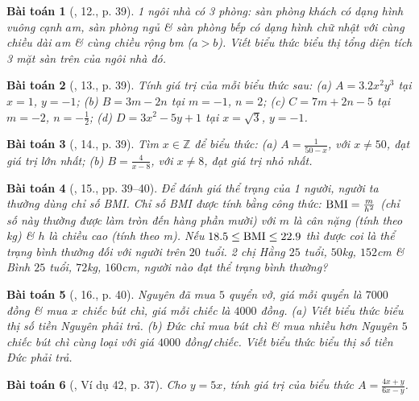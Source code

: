 \documentclass{article}
\newtheorem{baitoan}{Bài toán}
\begin{document}
\begin{baitoan}[\cite{SBT_Toan_7_Canh_Dieu_tap_2}, 12., p. 39]
	1 ngôi nhà có 3 phòng: sàn phòng khách có dạng hình vuông cạnh $a$\emph{m}, sàn phòng ngủ \& sàn phòng bếp có dạng hình chữ nhật với cùng chiều dài $a$\emph{m} \& cùng chiều rộng $b$\emph{m} ($a > b$). Viết biểu thức biểu thị tổng diện tích 3 mặt sàn trên của ngôi nhà đó.
\end{baitoan}

\begin{baitoan}[\cite{SBT_Toan_7_Canh_Dieu_tap_2}, 13., p. 39]
	Tính giá trị của mỗi biểu thức sau: (a) $A = 3.2x^2y^3$ tại $x = 1$, $y = -1$; (b) $B = 3m - 2n$ tại $m = -1$, $n = 2$; (c) $C = 7m + 2n - 5$ tại $m = -2$, $n = -\frac{1}{2}$; (d) $D = 3x^2 - 5y + 1$ tại $x = \sqrt{3}$, $y = -1$.
\end{baitoan}

\begin{baitoan}[\cite{SBT_Toan_7_Canh_Dieu_tap_2}, 14., p. 39]
	Tìm $x\in\mathbb{Z}$ để biểu thức: (a) $A = \frac{1}{50 - x}$, với $x\ne50$, đạt giá trị lớn nhất; (b) $B = \frac{4}{x - 8}$, với $x\ne8$, đạt giá trị nhỏ nhất.
\end{baitoan}

\begin{baitoan}[\cite{SBT_Toan_7_Canh_Dieu_tap_2}, 15., pp. 39--40]
	Để đánh giá thể trạng của 1 người, người ta thường dùng chỉ số BMI. Chỉ số BMI được tính bằng công thức: ${\rm BMI} = \frac{m}{h^2}$ (chỉ số này thường được làm tròn đến hàng phần mười) với $m$ là cân nặng (tính theo \emph{kg}) \& $h$ là chiều cao (tính theo \emph{m}). Nếu $18.5\le{\rm BMI}\le22.9$ thì được coi là thể trạng bình thường đối với người trên $20$ tuổi. 2 chị Hằng $25$ tuổi, $50$\emph{kg}, $152$\emph{cm} \& Bình $25$ tuổi, $72$\emph{kg}, $160$\emph{cm}, người nào đạt thể trạng bình thường?
\end{baitoan}

\begin{baitoan}[\cite{SBT_Toan_7_Canh_Dieu_tap_2}, 16., p. 40]
	Nguyên đã mua $5$ quyển vở, giá mỗi quyển là $7000$ đồng \& mua $x$ chiếc bút chì, giá mỗi chiếc là $4000$ đồng. (a) Viết biểu thức biểu thị số tiền Nguyên phải trả. (b) Đức chỉ mua bút chì \& mua nhiều hơn Nguyên $5$ chiếc bút chì cùng loại với giá $4000$ \emph{đồng\texttt{/}chiếc}. Viết biểu thức biểu thị số tiền Đức phải trả.
\end{baitoan}

\begin{baitoan}[\cite{Tuyen_Toan_7}, Ví dụ 42, p. 37]
	Cho $y = 5x$, tính giá trị của biểu thức $A = \frac{4x + y}{6x - y}$.
\end{baitoan}
\end{document}
